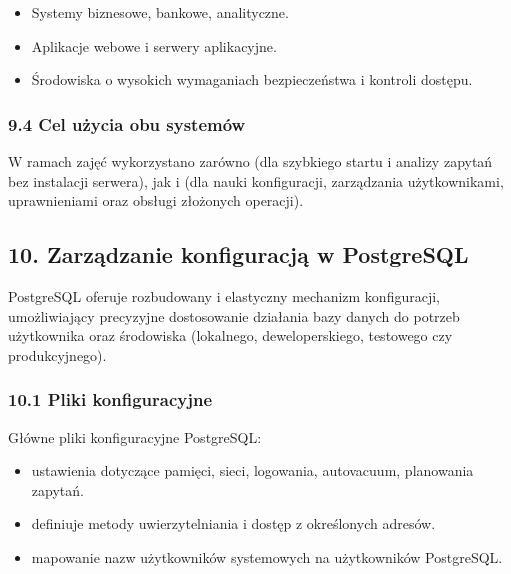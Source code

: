 \documentclass[a4paper,11pt,openany,english]{sphinxmanual}
\begin{document}
\sphinxAtStartPar
{}
\begin{itemize}
\item {} 
\sphinxAtStartPar
Systemy biznesowe, bankowe, analityczne.

\item {} 
\sphinxAtStartPar
Aplikacje webowe i serwery aplikacyjne.

\item {} 
\sphinxAtStartPar
Środowiska o wysokich wymaganiach bezpieczeństwa i kontroli dostępu.

\end{itemize}


\subsubsection{9.4 Cel użycia obu systemów}
\label{\detokenize{rozdzial2/Konfiguracja_baz_danych/Konfiguracja_baz_danych:cel-uzycia-obu-systemow}}
\sphinxAtStartPar
W ramach zajęć wykorzystano zarówno  (dla szybkiego startu i analizy zapytań bez instalacji serwera), jak i  (dla nauki konfiguracji, zarządzania użytkownikami, uprawnieniami oraz obsługi złożonych operacji).


\subsection{10. Zarządzanie konfiguracją w PostgreSQL}
\label{\detokenize{rozdzial2/Konfiguracja_baz_danych/Konfiguracja_baz_danych:zarzadzanie-konfiguracja-w-postgresql}}
\sphinxAtStartPar
PostgreSQL oferuje rozbudowany i elastyczny mechanizm konfiguracji, umożliwiający precyzyjne dostosowanie działania bazy danych do potrzeb użytkownika oraz środowiska (lokalnego, deweloperskiego, testowego czy produkcyjnego).


\subsubsection{10.1 Pliki konfiguracyjne}
\label{\detokenize{rozdzial2/Konfiguracja_baz_danych/Konfiguracja_baz_danych:pliki-konfiguracyjne}}
\sphinxAtStartPar
Główne pliki konfiguracyjne PostgreSQL:
\begin{itemize}
\item {} 
\sphinxAtStartPar
{} \textendash{} ustawienia dotyczące pamięci, sieci, logowania, autovacuum, planowania zapytań.

\item {} 
\sphinxAtStartPar
{} \textendash{} definiuje metody uwierzytelniania i dostęp z określonych adresów.

\item {} 
\sphinxAtStartPar
{} \textendash{} mapowanie nazw użytkowników systemowych na użytkowników PostgreSQL.

\end{itemize}
\end{document}
